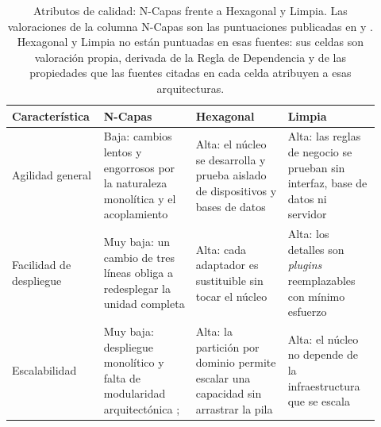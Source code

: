 \begin{table}[htbp]
  \centering
  \footnotesize
  \renewcommand{\arraystretch}{1.2}
  \begin{tabular}{@{}p{0.20\linewidth}p{0.24\linewidth}p{0.24\linewidth}p{0.24\linewidth}@{}}
    \toprule
    \textbf{Característica} & \textbf{N-Capas} & \textbf{Hexagonal} & \textbf{Limpia} \\
    \midrule
    \raggedright Agilidad general
      & \raggedright Baja: cambios lentos y engorrosos por la naturaleza monolítica y el
        acoplamiento \parencite[8]{richards2015}
      & \raggedright Alta: el núcleo se desarrolla y prueba aislado de dispositivos y bases de
        datos \parencite{cockburn2005}
      & \raggedright Alta: las reglas de negocio se prueban sin interfaz, base de datos ni
        servidor \parencite[202]{martin2017}
      \tabularnewline
    \raggedright Facilidad de despliegue
      & \raggedright Muy baja: un cambio de tres líneas obliga a redesplegar la unidad completa
        \parencite[cap.~10]{richardsford2020}
      & \raggedright Alta: cada adaptador es sustituible sin tocar el núcleo
        \parencite{cockburn2005}
      & \raggedright Alta: los detalles son \emph{plugins} reemplazables con mínimo esfuerzo
        \parencite[209]{martin2017}
      \tabularnewline
    \raggedright Escalabilidad
      & \raggedright Muy baja: despliegue monolítico y falta de modularidad arquitectónica
        \parencite[9]{richards2015}; \parencite[cap.~10]{richardsford2020}
      & \raggedright Alta: la partición por dominio permite escalar una capacidad sin arrastrar
        la pila \parencite{palermo2008}
      & \raggedright Alta: el núcleo no depende de la infraestructura que se escala
        \parencite[203]{martin2017}
      \tabularnewline
    \bottomrule
  \end{tabular}
  \caption{Atributos de calidad: N-Capas frente a Hexagonal y Limpia. Las valoraciones de la
    columna N-Capas son las puntuaciones publicadas en \textcite[8-9]{richards2015} y
    \textcite[cap.~10]{richardsford2020}. Hexagonal y Limpia no están puntuadas en esas fuentes:
    sus celdas son valoración propia, derivada de la Regla de Dependencia y de las propiedades
    que las fuentes citadas en cada celda atribuyen a esas arquitecturas.}
  \label{tab:p6-caracteristicas}
\end{table}


